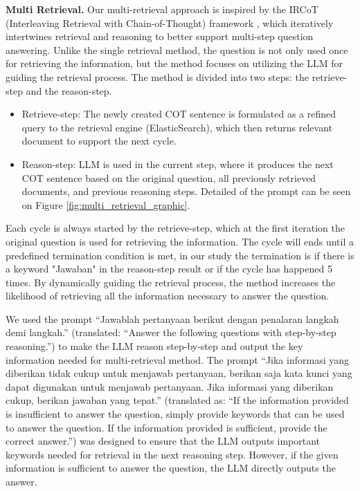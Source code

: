 \documentclass[times]{iapress}
\begin{document}
\textbf{Multi Retrieval.} Our multi-retrieval approach is inspired by the IRCoT (Interleaving Retrieval with Chain-of-Thought) framework \cite{ircot}, which iteratively intertwines retrieval and reasoning to better support multi-step question answering. Unlike the single retrieval method, the question is not only used once for retrieving the information, but the method focuses on utilizing the LLM for guiding the retrieval process. The method is divided into two steps: the retrieve-step and the reason-step.
\begin{itemize}
    \item Retrieve-step: The newly created COT sentence is formulated as a refined query to the retrieval engine (ElasticSearch), which then returns relevant document to support the next cycle.
    \item Reason-step: LLM is used in the current step, where it produces the next COT sentence based on the original question, all previously retrieved documents, and previous reasoning steps. Detailed of the prompt can be seen on Figure \ref{fig:multi_retrieval_graphic}.
\end{itemize}
Each cycle is always started by the retrieve-step, which at the first iteration the original question is used for retrieving the information. The cycle will ends until a predefined termination condition is met, in our study the termination is if there is a keyword "Jawaban" in the reason-step result or if the cycle has happened 5 times. By dynamically guiding the retrieval process, the method increases the likelihood of retrieving all the information necessary to answer the question. 

We used the prompt “Jawablah pertanyaan berikut dengan penalaran langkah demi langkah.” (translated: “Answer the following questions with step-by-step reasoning.”) to make the LLM reason step-by-step and output the key information needed for multi-retrieval method. The prompt “Jika informasi yang diberikan tidak cukup untuk menjawab pertanyaan, berikan saja kata kunci yang dapat digunakan untuk menjawab pertanyaan. Jika informasi yang diberikan cukup, berikan jawaban yang tepat.” (translated as: “If the information provided is insufficient to answer the question, simply provide keywords that can be used to answer the question. If the information provided is sufficient, provide the correct answer.”) was designed to ensure that the LLM outputs important keywords needed for retrieval in the next reasoning step. However, if the given information is sufficient to answer the question, the LLM directly outputs the answer.
\end{document}
